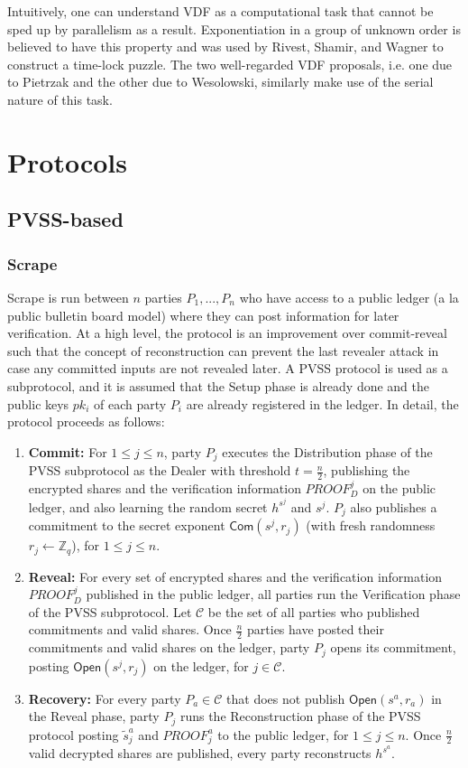 \documentclass[11pt]{article}
\theoremstyle{definition}
\theoremstyle{remark}
\begin{document}
Intuitively, one can understand VDF as a computational task that cannot be sped up by parallelism as a result. Exponentiation in a group of unknown order is believed to have this property and was used by Rivest, Shamir, and Wagner to construct a time-lock puzzle. The two well-regarded VDF proposals, i.e. one due to Pietrzak and the other due to Wesolowski, similarly make use of the serial nature of this task.

\section{Protocols}
\subsection{PVSS-based}
\subsubsection{Scrape}
Scrape is run between $n$ parties $P_1, ..., P_n$ who have access to a public ledger (a la public bulletin board model) where they can post information for later verification. At a high level, the protocol is an improvement over commit-reveal such that the concept of reconstruction can prevent the last revealer attack in case any committed inputs are not revealed later. A PVSS protocol is used as a subprotocol, and it is assumed that the Setup phase is already done and the public keys $pk_i$ of each party $P_i$ are already registered in the ledger. In detail, the protocol proceeds as follows:

\begin{enumerate}
\item \textbf{Commit:} For $1 \leq j \leq n$, party $P_j$ executes the Distribution phase of the PVSS subprotocol as the Dealer with threshold $t = \frac{n}{2}$, publishing the encrypted shares and the verification information $PROOF_D^j$ on the public ledger, and also learning the random secret $h^{s^j}$ and $s^j$. $P_j$ also publishes a commitment to the secret exponent $\mathsf{Com}(s^j, r_j)$ (with fresh randomness $r_j \leftarrow \mathbb{Z}_q$), for $1 \leq j \leq n$.
\item \textbf{Reveal:} For every set of encrypted shares and the verification information $PROOF_D^j$ published in the public ledger, all parties run the Verification phase of the PVSS subprotocol. Let $\mathcal{C}$ be the set of all parties who published commitments and valid shares. Once $\frac{n}{2}$ parties have posted their commitments and valid shares on the ledger, party $P_j$ opens its commitment, posting $\mathsf{Open}(s^j, r_j)$ on the ledger, for $j \in \mathcal{C}$.
\item \textbf{Recovery:} For every party $P_a \in \mathcal{C}$ that does not publish $\mathsf{Open}(s^a, r_a)$ in the Reveal phase, party $P_j$ runs the Reconstruction phase of the PVSS protocol posting $\tilde{s}_j^a$ and $PROOF_j^a$ to the public ledger, for $1 \leq j \leq n$. Once $\frac{n}{2}$ valid decrypted shares are published, every party reconstructs $h^{s^a}$.
\end{enumerate}
\end{document}
